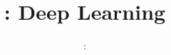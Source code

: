 \usepackage{../../beamerthemeFalmouthGamesAcademy}
\usepackage{multimedia}
\graphicspath{ {../../} }


\usepackage[normalem]{ulem}
\usepackage{wasysym}

\usepackage{pdfpages}

\usetikzlibrary{arrows,automata}




\title{\sessionnumber: Deep Learning}
\subtitle{\modulecode: \moduletitle}

\frame{\titlepage} 




